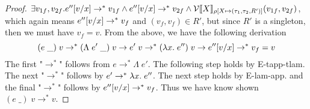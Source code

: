 \documentclass[twoside,11pt,openright]{report}
\theoremstyle{definition}
\newcommand{\var}{x}
\newcommand{\expr}{e}
\newcommand{\val}{v}
\newcommand{\Tvar}{X}
\newcommand{\Tlam}{\Lambda\;}
\newcommand{\Tapp}[1]{#1\;\_}
\newcommand{\subst}[3]{#1{\left[#3 \middle/ #2 \right]}}
\newcommand{\typ}{\tau}
\newcommand{\step}{\rightarrow}
\newcommand{\stepS}{\rightarrow^*}
\newcommand{\ValInp}[2]{\mathcal{V} \llbracket #1 \rrbracket_{#2}}
\newcommand{\map}[2]{#1 \mapsto #2}
\begin{document}
\begin{proof}
  $\exists \val_{1f}, \val_{2f} . \subst{\expr''}{\var}{\val} \stepS \val_{1f} \land \subst{\expr''}{\var}{\val} \stepS \val_{2f} \land \ValInp{\Tvar}{\rho[\map{\Tvar}{(\typ_1, \typ_2, R')}]}(\val_{1f}, \val_{2f})$, which again means $\subst{\expr''}{\var}{\val} \stepS \val_f$ and $(\val_f, \val_f) \in R'$, but since $R'$ is a singleton, then we must have $\val_f = \val$. From the above, we have the following derivation
  \begin{equation}
    (\Tapp{\expr}) \; \val \stepS (\Tapp{\Tlam \expr'}) \; \val \step \expr' \; \val \stepS (\fun \var . \expr'') \; \val \step \subst{\expr''}{\var}{\val} \stepS \val_f = \val
  \end{equation}
  The first "$\stepS$" follows from $\expr \stepS \Tlam \expr'$. The following step holds by E-tapp-tlam. The next "$\stepS$" follows by $\expr' \stepS \fun \var . \expr''$. The next step holds by E-lam-app. and the final "$\stepS$" follows by $\subst{\expr''}{\var}{\val} \stepS \val_f$. Thus we have know shown $(\Tapp{\expr}) \; \val \stepS \val$.
\end{proof}
\end{document}
